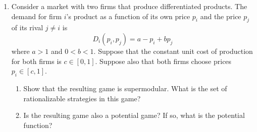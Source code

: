 \documentclass[11pt]{article}
\begin{document}
\newpage
\begin{enumerate}[leftmargin=*, start=3]
    \item Consider a market with two firms that produce differentiated products. The demand for firm $i$'s product as a function of its own price $p_i$ and the price $p_j$ of its rival $j \neq i$ is
    \[
    D_i(p_i, p_j) = a - p_i + b p_j
    \]
    where $a > 1$ and $0 < b < 1$. Suppose that the constant unit cost of production for both firms is $c \in [0, 1]$. Suppose also that both firms choose prices $p_i \in [c, 1]$.
    
    \begin{enumerate}[label=(\alph*)]
        \item Show that the resulting game is supermodular. What is the set of rationalizable strategies in this game?
        
        \item Is the resulting game also a potential game? If so, what is the potential function?
    \end{enumerate}
\end{enumerate}
\end{document}
